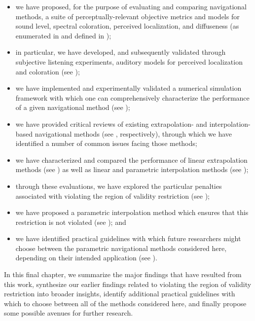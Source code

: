 \begin{itemize}
\item we have proposed, for the purpose of evaluating and comparing navigational methods, a suite of perceptually-relevant objective metrics and models for sound level, spectral coloration, perceived localization, and diffuseness (as enumerated in  and defined in );
\item in particular, we have developed, and subsequently validated through subjective listening experiments, auditory models for perceived localization and coloration (see );
\item we have implemented and experimentally validated a numerical simulation framework with which one can comprehensively characterize the performance of a given navigational method (see );
\item we have provided critical reviews of existing extrapolation- and interpolation-based navigational methods (see , respectively), through which we have identified a number of common issues facing those methods;
\item we have characterized and compared the performance of linear extrapolation methods (see ) as well as linear and parametric interpolation methods (see );
\item through these evaluations, we have explored the particular penalties associated with violating the region of validity restriction (see );
\item we have proposed a parametric interpolation method which ensures that this restriction is not violated (see ); and
\item we have identified practical guidelines with which future researchers might choose between the parametric navigational methods considered here, depending on their intended application (see ).
\end{itemize}
In this final chapter, we summarize the major findings that have resulted from this work, synthesize our earlier findings related to violating the region of validity restriction into broader insights, identify additional practical guidelines with which to choose between all of the methods considered here, and finally propose some possible avenues for further research.

